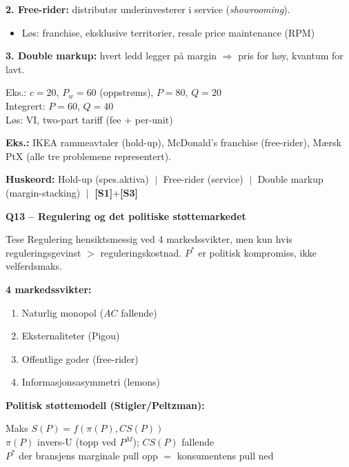 \documentclass[10pt, a4paper]{article}
\newcommand{\SOne}{\textcolor{s1color}{\textbf{[S1]}}}
\newcommand{\SThree}{\textcolor{s3color}{\textbf{[S3]}}}
\newcommand{\qhead}[2]{%
  \noindent
  \begin{tcolorbox}[colback=boxborder, colframe=boxborder, arc=2pt, left=6pt, right=6pt, top=2pt, bottom=2pt]
    \color{white}\textbf{\large Q#1 -- #2}
  \end{tcolorbox}
}
\newcommand{\huskeord}[1]{%
  \vspace{2pt}
  \begin{tcolorbox}[colback=yellow!15, colframe=orange!70!black, boxrule=0.4pt, arc=2pt, left=4pt, right=4pt, top=2pt, bottom=2pt]
    \footnotesize\textbf{Huskeord:} #1
  \end{tcolorbox}
}
\begin{document}
\textbf{2. Free-rider:} distributør underinvesterer i service (\emph{showrooming}).
\begin{itemize}
  \item Løs: franchise, eksklusive territorier, resale price maintenance (RPM)
\end{itemize}

\textbf{3. Double markup:} hvert ledd legger på margin $\Rightarrow$ pris for høy, kvantum for lavt.

\begin{formulabox}
Eks.: $c=20$, $P_w=60$ (oppstrøms), $P=80$, $Q=20$ \\
Integrert: $P=60$, $Q=40$ \\
Løs: VI, two-part tariff (fee + per-unit)
\end{formulabox}

\textbf{Eks.:} IKEA rammeavtaler (hold-up), McDonald's franchise (free-rider), Mærsk PtX (alle tre problemene representert).

\huskeord{Hold-up (spes.aktiva) $\;\big|\;$ Free-rider (service) $\;\big|\;$ Double markup (margin-stacking) $\;\big|\;$ \SOne+\SThree}

\vfill\newpage

\qhead{13}{Regulering og det politiske støttemarkedet}

\begin{keybox}{Tese}
Regulering hensiktsmessig ved 4 markedssvikter, men kun hvis reguleringsgevinst $>$ reguleringskostnad. $P^{*}$ er politisk kompromiss, ikke velferdsmaks.
\end{keybox}

\textbf{4 markedssvikter:}
\begin{enumerate}
  \item Naturlig monopol ($AC$ fallende)
  \item Eksternaliteter (Pigou)
  \item Offentlige goder (free-rider)
  \item Informasjonsasymmetri (lemons)
\end{enumerate}

\textbf{Politisk støttemodell (Stigler/Peltzman):}
\begin{formulabox}
Maks $S(P) = f(\pi(P), CS(P))$ \\
$\pi(P)$ invers-U (topp ved $P^M$); $CS(P)$ fallende \\
$P^{*}$ der bransjens marginale pull opp $=$ konsumentens pull ned
\end{formulabox}
\end{document}
